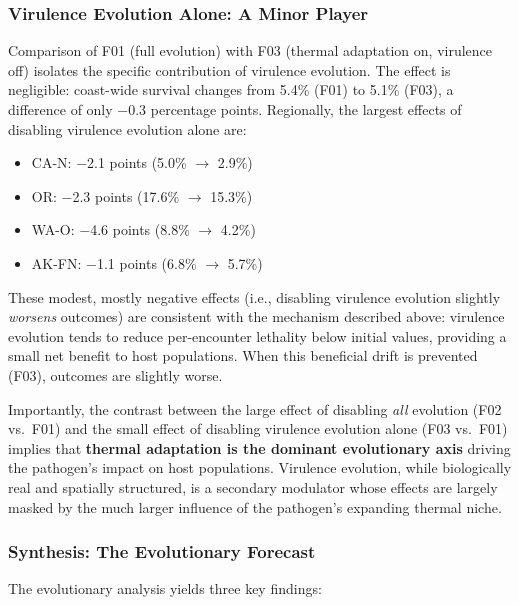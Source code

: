 \subsubsection{Virulence Evolution Alone: A Minor Player}

Comparison of F01 (full evolution) with F03 (thermal adaptation on,
virulence off) isolates the specific contribution of virulence
evolution.  The effect is negligible: coast-wide survival changes from
5.4\% (F01) to 5.1\% (F03), a difference of only $-$0.3 percentage
points.  Regionally, the largest effects of disabling virulence
evolution alone are:

\begin{itemize}
  \item CA-N: $-$2.1 points (5.0\% $\rightarrow$ 2.9\%)
  \item OR: $-$2.3 points (17.6\% $\rightarrow$ 15.3\%)
  \item WA-O: $-$4.6 points (8.8\% $\rightarrow$ 4.2\%)
  \item AK-FN: $-$1.1 points (6.8\% $\rightarrow$ 5.7\%)
\end{itemize}

\noindent
These modest, mostly negative effects (i.e., disabling virulence
evolution slightly \textit{worsens} outcomes) are consistent with the
mechanism described above: virulence evolution tends to reduce
per-encounter lethality below initial values, providing a small net
benefit to host populations.  When this beneficial drift is prevented
(F03), outcomes are slightly worse.

Importantly, the contrast between the large effect of disabling
\textit{all} evolution (F02 vs.\ F01) and the small effect of
disabling virulence evolution alone (F03 vs.\ F01) implies that
\textbf{thermal adaptation is the dominant evolutionary axis} driving
the pathogen's impact on host populations.  Virulence evolution, while
biologically real and spatially structured, is a secondary modulator
whose effects are largely masked by the much larger influence of the
pathogen's expanding thermal niche.

\subsubsection{Synthesis: The Evolutionary Forecast}

The evolutionary analysis yields three key findings:

